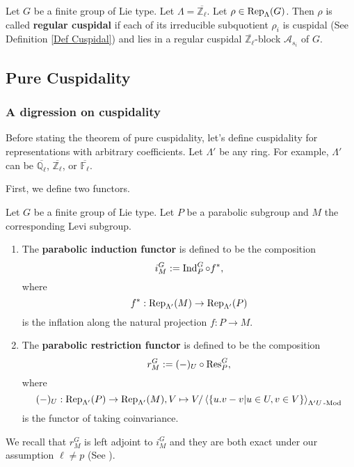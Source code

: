 	\begin{definition}\label{Def regular cuspidal}
		Let $G$ be a finite group of Lie type. Let $\Lambda=\overline{\mathbb{Z}_{\ell}}$. Let $\rho \in \operatorname{\operatorname{Rep}}_{\Lambda}(G)$. Then $\rho$ is called \textbf{regular cuspidal} if each of its irreducible subquotient $\rho_i$ is cuspidal (See Definition \ref{Def Cuspidal}) and lies in a regular cuspidal $\overline{\mathbb{Z}_{\ell}}$-block $\mathcal{A}_{s_i}$ of $G$.
	\end{definition}
	
	
	
	
	\subsection{Pure Cuspidality}
	
	\subsubsection{A digression on cuspidality}
	
	Before stating the theorem of pure cuspidality, let's define cuspidality for representations with arbitrary coefficients. Let $\Lambda'$ be any ring. For example, $\Lambda'$ can be $\overline{\mathbb{Q}_{\ell}}$, $\overline{\mathbb{Z}_{\ell}}$, or $\overline{\mathbb{F}_{\ell}}$.
	
	First, we define two functors.
	
	\begin{definition} 
		Let $G$ be a finite group of Lie type. Let $P$ be a parabolic subgroup and $M$ the corresponding Levi subgroup.
		\begin{enumerate}
			\item The \textbf{parabolic induction functor} is defined to be the composition 
			$$i_M^G:= \operatorname{\operatorname{Ind}}_P^G \circ f^*,$$ where 
			$$f^*: \operatorname{\operatorname{Rep}}_{\Lambda'}(M) \to \operatorname{\operatorname{Rep}}_{\Lambda'}(P)$$
			is the inflation along the natural projection $f: P \to M$. 
			\item The \textbf{parabolic restriction functor} is defined to be the composition 
			$$r_M^G:= (-)_U \circ \operatorname{\operatorname{Res}}_P^G,$$ where 
			$$(-)_U: \operatorname{\operatorname{Rep}}_{\Lambda'}(P) \to \operatorname{\operatorname{Rep}}_{\Lambda'}(M), V \mapsto V/\left<\{u.v-v | u \in U, v \in V\}\right>_{\Lambda'U\operatorname{-Mod}}$$
			is the functor of taking coinvariance.
		\end{enumerate}
	\end{definition}
	
	We recall that $r_M^G$ is left adjoint to $i_M^G$ and they are both exact under our assumption $\ell \neq p$ (See \cite[II.2.1]{vigneras1996representations}).
	
